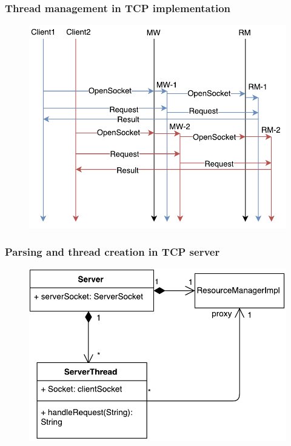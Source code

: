 \documentclass[10pt]{beamer}
\begin{document}
\begin{frame}
\frametitle{Thread management in TCP implementation}
\begin{figure}
\centering
\includegraphics[scale=0.5]{figures/threads.pdf}
\end{figure}
\end{frame}


\begin{frame}
\frametitle{Parsing and thread creation in TCP server}
\begin{figure}
\centering
\includegraphics[scale=0.5]{figures/server-class.pdf}
\end{figure}
\end{frame}
\end{document}
